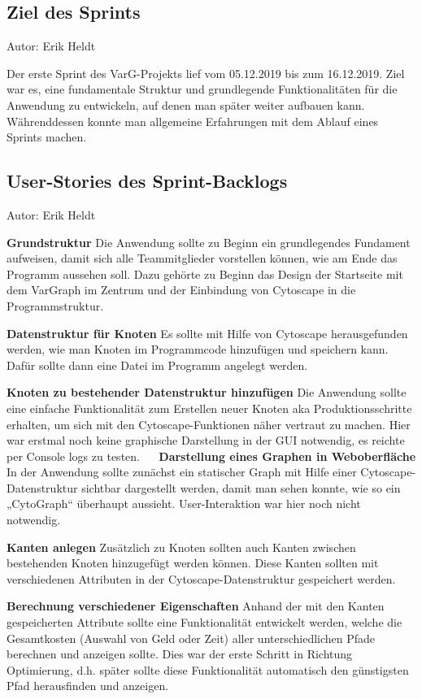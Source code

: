
\subsection{Ziel des Sprints}
{\small Autor: Erik Heldt}

Der erste Sprint des VarG-Projekts lief vom 05.12.2019 bis zum 16.12.2019. Ziel war es, eine fundamentale Struktur und grundlegende Funktionalitäten für die Anwendung zu entwickeln, auf denen man später weiter aufbauen kann. Währenddessen konnte man allgemeine Erfahrungen mit dem Ablauf eines Sprints machen.

\subsection{User-Stories des Sprint-Backlogs}
{\small Autor: Erik Heldt}

\textbf{Grundstruktur}
Die Anwendung sollte zu Beginn ein grundlegendes Fundament aufweisen, damit sich alle Teammitglieder vorstellen können, wie am Ende das Programm aussehen soll. Dazu gehörte zu Beginn das Design der Startseite mit dem VarGraph im Zentrum und der Einbindung von Cytoscape in die Programmstruktur.

\textbf{Datenstruktur für Knoten}
Es sollte mit Hilfe von Cytoscape herausgefunden werden, wie man Knoten im Programmcode hinzufügen und speichern kann. Dafür sollte dann eine Datei im Programm angelegt werden.

\textbf{Knoten zu bestehender Datenstruktur hinzufügen}
Die Anwendung sollte eine einfache Funktionalität zum Erstellen neuer Knoten aka Produktionsschritte erhalten, um sich mit den Cytoscape-Funktionen näher vertraut zu machen. Hier war erstmal noch keine graphische Darstellung in der GUI notwendig, es reichte per Console logs zu testen.
 
\textbf{Darstellung eines Graphen in Weboberfläche}
In der Anwendung sollte zunächst ein statischer Graph mit Hilfe einer Cytoscape-Datenstruktur sichtbar dargestellt werden, damit man sehen konnte, wie so ein „CytoGraph“ überhaupt aussieht. User-Interaktion war hier noch nicht notwendig.

\textbf{Kanten anlegen}
Zusätzlich zu Knoten sollten auch Kanten zwischen bestehenden Knoten hinzugefügt werden können. Diese Kanten sollten mit verschiedenen Attributen in der Cytoscape-Datenstruktur gespeichert werden.

\textbf{Berechnung verschiedener Eigenschaften}
Anhand der mit den Kanten gespeicherten Attribute sollte eine Funktionalität entwickelt werden, welche die Gesamtkosten (Auswahl von Geld oder Zeit) aller unterschiedlichen Pfade berechnen und anzeigen sollte. Dies war der erste Schritt in Richtung Optimierung, d.h. später sollte diese Funktionalität automatisch den günstigsten Pfad herausfinden und anzeigen.

